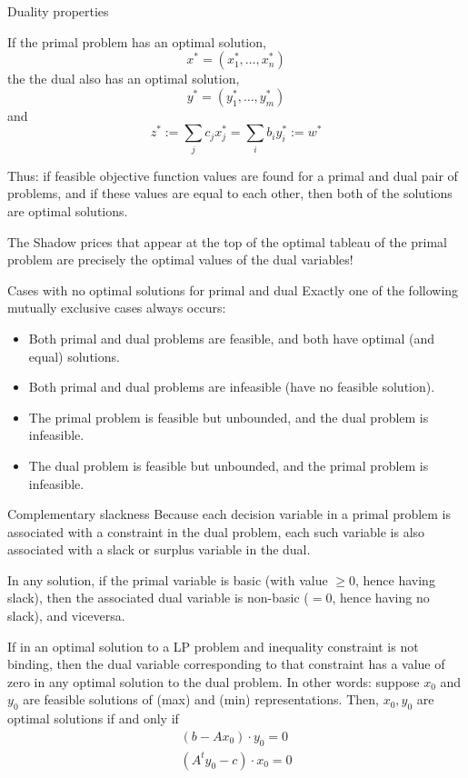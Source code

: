\documentclass[c]{beamer}
\begin{document}
\begin{frame}{Duality properties}


\begin{theorem}
  If the primal problem has an optimal solution,
  \[
  x^* = (x_1^*, \ldots, x_n^*)
  \]
  the the dual also has an optimal solution,
  \[
  y^* = (y_1^*, \ldots, y_m^*)
  \]
and
\[
z^* := \sum_j c_j x_j^* = \sum_i b_i y_i^* := w^*
\]

\end{theorem}
Thus: if feasible objective function values are found for a primal and dual pair of problems, and if these values are equal to each other, then both of the solutions are optimal solutions.

The Shadow prices that appear at the top of the optimal tableau of the primal problem are precisely the optimal values of the dual variables!
\end{frame}

\begin{frame}{Cases with no optimal solutions for primal and dual}
  Exactly one of the following mutually exclusive cases always occurs:
  \begin{itemize}
    \item Both primal and dual problems are feasible, and both have optimal (and equal) solutions.
    \item Both primal and dual problems are infeasible (have no feasible solution).
    \item The primal problem is feasible but unbounded, and the dual problem is infeasible.
    \item The dual problem is feasible but unbounded, and the primal problem is infeasible.
  \end{itemize}
\end{frame}

\begin{frame}{Complementary slackness}
  Because each decision variable in a primal problem is associated with a constraint in the dual problem, each such variable is also associated with a slack or surplus variable in the dual.

  In any solution, if the primal variable is basic (with value $\geq0$, hence having slack), then the associated dual variable is non-basic ($=0$, hence having no slack), and viceversa.

  \begin{theorem}
    If in an optimal solution to a LP problem and inequality constraint is not binding, then the dual variable corresponding to that constraint has a value of zero in any optimal solution to the dual problem. In other words: suppose $x_0$ and $y_0$ are feasible solutions of (max) and (min) representations. Then, $x_0,y_0$ are optimal solutions if and only if
    \begin{eqnarray*}
      (b-Ax_0)\cdot y_0 =0\\
      (A^ty_0-c) \cdot x_0 =0
    \end{eqnarray*}
  \end{theorem}
\end{frame}
\end{document}
